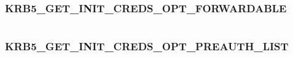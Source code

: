 \documentclass[letterpaper,10pt,english]{sphinxmanual}
\begin{document}
\begin{tabulary}{\linewidth}{|L|L|}
\hline

 & 
\\\hline
\end{tabulary}



\subsubsection{KRB5\_GET\_INIT\_CREDS\_OPT\_FORWARDABLE}
\label{appdev/refs/macros/KRB5_GET_INIT_CREDS_OPT_FORWARDABLE::doc}\label{appdev/refs/macros/KRB5_GET_INIT_CREDS_OPT_FORWARDABLE:krb5-get-init-creds-opt-forwardable}\label{appdev/refs/macros/KRB5_GET_INIT_CREDS_OPT_FORWARDABLE:krb5-get-init-creds-opt-forwardable-data}

\begin{fulllineitems}
\label{appdev/refs/macros/KRB5_GET_INIT_CREDS_OPT_FORWARDABLE:KRB5_GET_INIT_CREDS_OPT_FORWARDABLE}
\end{fulllineitems}


\begin{tabulary}{\linewidth}{|L|L|}
\hline

 & 
\\\hline
\end{tabulary}



\subsubsection{KRB5\_GET\_INIT\_CREDS\_OPT\_PREAUTH\_LIST}
\label{appdev/refs/macros/KRB5_GET_INIT_CREDS_OPT_PREAUTH_LIST:krb5-get-init-creds-opt-preauth-list}\label{appdev/refs/macros/KRB5_GET_INIT_CREDS_OPT_PREAUTH_LIST:krb5-get-init-creds-opt-preauth-list-data}\label{appdev/refs/macros/KRB5_GET_INIT_CREDS_OPT_PREAUTH_LIST::doc}

\begin{fulllineitems}
\label{appdev/refs/macros/KRB5_GET_INIT_CREDS_OPT_PREAUTH_LIST:KRB5_GET_INIT_CREDS_OPT_PREAUTH_LIST}
\end{fulllineitems}
\end{document}
